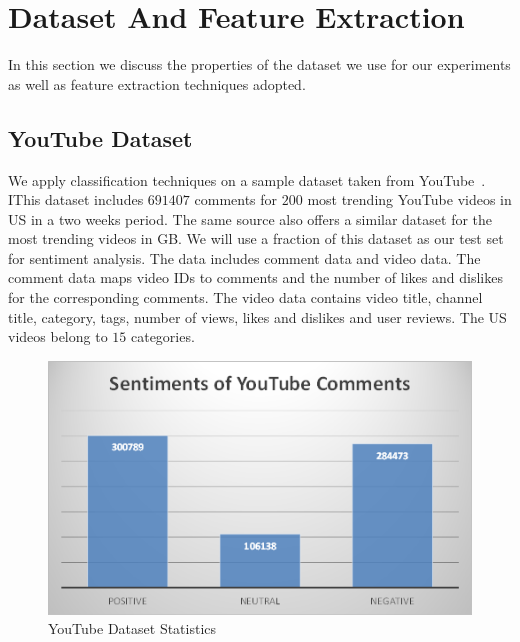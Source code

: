 \section{Dataset And Feature Extraction}
\label{sec:data}
In this section we discuss the properties of the dataset we use for our experiments as well as feature extraction techniques adopted.

\subsection{YouTube Dataset}
\label{sec:youtubedataset}
We apply classification techniques on a sample dataset taken from YouTube~\cite{youtubedata}. 
IThis dataset includes $691407$ comments for $200$ most trending YouTube videos in US in a two weeks period. 
The same source also offers a similar dataset for the most trending videos in GB. 
We will use a fraction of this dataset as our test set for sentiment analysis. 
The data includes comment data and video data. The comment data maps video IDs to comments and the number of likes and dislikes for the corresponding comments. The video data contains video title, channel title, category, tags, number of views, likes and dislikes and user reviews. The US videos belong to $15$ categories.

\begin{figure}%
\centering
\includegraphics[width=1.0\columnwidth]{figures/datastats.png}%
\caption{YouTube Dataset Statistics}%
\label{fig:datastats}%
\end{figure}


